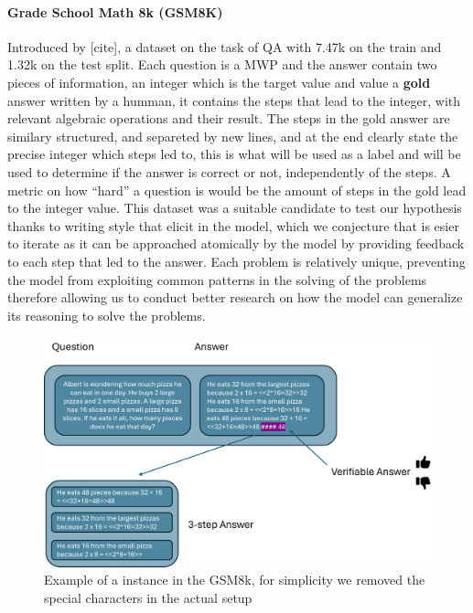 \documentclass[a4paper,10pt]{article}
\begin{document}
\paragraph{Grade School Math 8k (GSM8K)}
Introduced by [cite], a dataset on the task of QA with 7.47k on the train and 1.32k on the test split. Each question is a MWP and the answer contain two pieces of information, an integer which is the target value and value a \textbf{gold} answer written by a humman, it contains the steps that lead to the integer, with relevant algebraic operations and their result. The steps in the gold answer are similary structured, and separeted by new lines, and at the end clearly state the precise integer which steps led to, this is what will be used as a label and will be used to determine if the answer is correct or not, independently of the steps. A metric on how ``hard'' a question is would be the amount of steps in the gold lead to the integer value. This dataset was a suitable candidate to test our hypothesis thanks to writing style that elicit in the model, which we conjecture that is esier to iterate as it can be approached atomically by the model by providing feedback to each step that led to the answer. Each problem is relatively unique, preventing the model from exploiting common patterns in the solving of the problems therefore allowing us to conduct better research on how the model can generalize its reasoning to solve the problems.

\begin{figure}[h]
\centering
\includegraphics[scale=0.3]{figures/dataset_example}
\caption{Example of a instance in the GSM8k, for simplicity we removed the special characters in the actual setup}
\end{figure}
\end{document}
